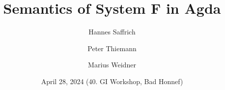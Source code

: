 \documentclass[dvipsnames,aspectratio=169,pdftex]{beamer}
\title{Semantics of System F in Agda}
\author[Saffrich, Thiemann, Weidner]
{
Hannes Saffrich \and Peter Thiemann \and
{Marius Weidner} 
}
\institute{University of Freiburg
}
\date{April 28, 2024 (40. GI Workshop, Bad Honnef)}
\begin{document}
\begin{frame}{\null}
  \titlepage 
\end{frame}
\end{document}
